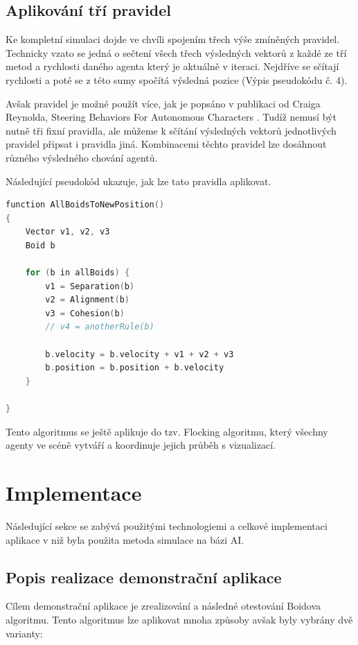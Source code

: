 \documentclass[czech,public,dept460,male,cpdeclaration]{diploma}
\begin{document}
\subsection{Aplikování tří pravidel}\label{sec:aplikovani-tri-pravidel}
Ke kompletní simulaci dojde ve chvíli spojením třech výše zmíněných pravidel. Technicky vzato se jedná o sečtení všech třech výsledných vektorů z každé ze tří metod a rychlosti daného agenta který je aktuálně v iteraci. Nejdříve se sčítají rychlosti a poté se z této sumy spočítá výsledná pozice (Výpis pseudokódu č. 4).

Avšak pravidel je možné použít více, jak je popsáno v publikaci od Craiga Reynolda, Steering Behaviors For Autonomous Characters \cite{linkToSteeringBehaviors}. Tudíž nemusí být nutně tři fixní pravidla, ale můžeme k sčítání výsledných vektorů jednotlivých pravidel připsat i pravidla jiná. Kombinacemi těchto pravidel lze dosáhnout různého výsledného chování agentů.

Následující pseudokód ukazuje, jak lze tato pravidla aplikovat.

\begin{lstlisting}[language=c++,label=src:Flocking pseudocode,caption=Pseudokód pro aplikování třech pravidel]
function AllBoidsToNewPosition()
{
	Vector v1, v2, v3
	Boid b
	
	for (b in allBoids) {
		v1 = Separation(b)
		v2 = Alignment(b)
		v3 = Cohesion(b)
		// v4 = anotherRule(b)
		
		b.velocity = b.velocity + v1 + v2 + v3
		b.position = b.position + b.velocity
	}

}
\end{lstlisting}

Tento algoritmus se ještě aplikuje do tzv. Flocking algoritmu, který všechny agenty ve scéně vytváří a koordinuje jejich průběh s vizualizací.

\newpage
\section{Implementace}
Následující sekce se zabývá použitými technologiemi a celkové implementaci aplikace v niž byla použita metoda simulace na bázi AI.

\subsection{Popis realizace demonstrační aplikace}
Cílem demonstrační aplikace je zrealizování a následné otestování Boidova algoritmu. Tento algoritmus lze aplikovat mnoha způsoby avšak byly vybrány dvě varianty:
\end{document}
